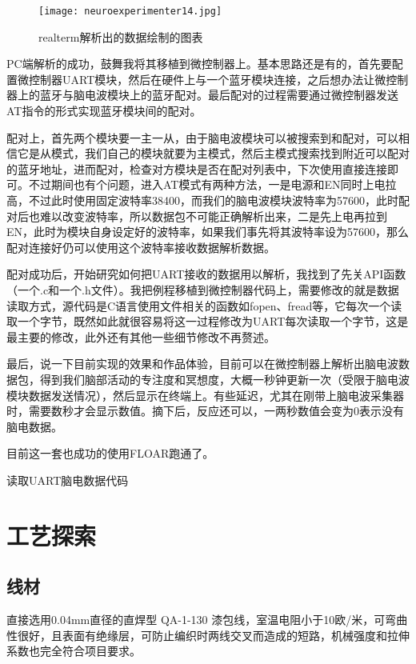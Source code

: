 \begin{figure}[htbp]
\centering
\texttt{[image: neuroexperimenter14.jpg]}
\caption{realterm解析出的数据绘制的图表} 
\label{realterm}
\end{figure}

PC端解析的成功，鼓舞我将其移植到微控制器上。基本思路还是有的，首先要配置微控制器UART模块，然后在硬件上与一个蓝牙模块连接，之后想办法让微控制器上的蓝牙与脑电波模块上的蓝牙配对。最后配对的过程需要通过微控制器发送AT指令的形式实现蓝牙模块间的配对。

配对上，首先两个模块要一主一从，由于脑电波模块可以被搜索到和配对，可以相信它是从模式，我们自己的模块就要为主模式，然后主模式搜索找到附近可以配对的蓝牙地址，进而配对，检查对方模块是否在配对列表中，下次使用直接连接即可。不过期间也有个问题，进入AT模式有两种方法，一是电源和EN同时上电拉高，不过此时使用固定波特率38400，而我们的脑电波模块波特率为57600，此时配对后也难以改变波特率，所以数据包不可能正确解析出来，二是先上电再拉到EN，此时为模块自身设定好的波特率，如果我们事先将其波特率设为57600，那么配对连接好仍可以使用这个波特率接收数据解析数据。

配对成功后，开始研究如何把UART接收的数据用以解析，我找到了先关API函数（一个.c和一个.h文件）。我把例程移植到微控制器代码上，需要修改的就是数据读取方式，源代码是C语言使用文件相关的函数如fopen、fread等，它每次一个读取一个字节，既然如此就很容易将这一过程修改为UART每次读取一个字节，这是最主要的修改，此外还有其他一些细节修改不再赘述。

最后，说一下目前实现的效果和作品体验，目前可以在微控制器上解析出脑电波数据包，得到我们脑部活动的专注度和冥想度，大概一秒钟更新一次（受限于脑电波模块数据发送情况），然后显示在终端上。有些延迟，尤其在刚带上脑电波采集器时，需要数秒才会显示数值。摘下后，反应还可以，一两秒数值会变为0表示没有脑电数据。

目前这一套也成功的使用FLOAR跑通了。

读取UART脑电数据代码



\section{工艺探索}


\subsection{线材}
直接选用0.04mm直径的直焊型 QA-1-130 漆包线，室温电阻小于10欧/米，可弯曲性很好，且表面有绝缘层，可防止编织时两线交叉而造成的短路，机械强度和拉伸系数也完全符合项目要求。


